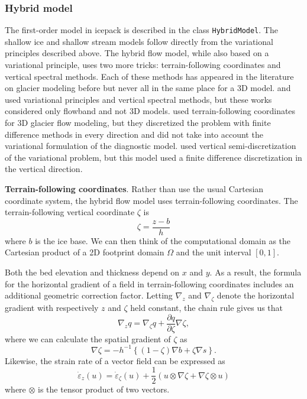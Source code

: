 \documentclass[journal abbreviation, manuscript]{copernicus}
\begin{document}
\subsubsection{Hybrid model} \label{sec:physics-hybrid-model}

The first-order model in icepack is described in the class \texttt{HybridModel}.
The shallow ice and shallow stream models follow directly from the variational principles described above.
The hybrid flow model, while also based on a variational principle, uses two more tricks: terrain-following coordinates and vertical spectral methods.
Each of these methods has appeared in the literature on glacier modeling before but never all in the same place for a 3D model.
\citet{langdon1978numerical} and \cite{bassis2010hamilton} used variational principles and vertical spectral methods, but these works considered only flowband and not 3D models.
\citet{kleiner2014numerical} used terrain-following coordinates for 3D glacier flow modeling, but they discretized the problem with finite difference methods in every direction and did not take into account the variational formulation of the diagnostic model.
\citet{jouvet2015multilayer} used vertical semi-discretization of the variational problem, but this model used a finite difference discretization in the vertical direction.

\textbf{Terrain-following coordinates}.
Rather than use the usual Cartesian coordinate system, the hybrid flow model uses terrain-following coordinates.
The terrain-following vertical coordinate $\zeta$ is
\begin{equation}
    \zeta = \frac{z - b}{h}
\end{equation}
where $b$ is the ice base.
We can then think of the computational domain as the Cartesian product of a 2D footprint domain $\Omega$ and the unit interval $[0, 1]$.

Both the bed elevation and thickness depend on $x$ and $y$.
As a result, the formula for the horizontal gradient of a field in terrain-following coordinates includes an additional geometric correction factor.
Letting $\nabla_z$ and $\nabla_\zeta$ denote the horizontal gradient with respectively $z$ and $\zeta$ held constant, the chain rule gives us that
\begin{equation}
    \nabla_zq = \nabla_\zeta q + \frac{\partial q}{\partial\zeta}\nabla\zeta,
\end{equation}
where we can calculate the spatial gradient of $\zeta$ as
\begin{equation}
    \nabla\zeta = -h^{-1}\left\{(1 - \zeta)\nabla b + \zeta\nabla s\right\}.
\end{equation}
Likewise, the strain rate of a vector field can be expressed as
\begin{equation}
    \dot\varepsilon_z(u) = \dot\varepsilon_\zeta(u) + \frac{1}{2}\left(u \otimes\nabla\zeta + \nabla\zeta\otimes u\right)
    \label{eq:geometric-correction}
\end{equation}
where $\otimes$ is the tensor product of two vectors.
\end{document}

